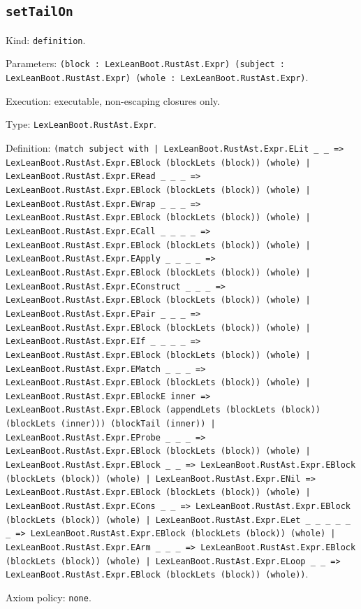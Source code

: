 \documentclass[11pt]{article}
\begin{document}
\subsection*{\texttt{setTailOn}}
\noindent Kind: \texttt{definition}.\par
\noindent Parameters: \texttt{(block : LexLeanBoot.RustAst.Expr) (subject : LexLeanBoot.RustAst.Expr) (whole : LexLeanBoot.RustAst.Expr)}.\par
\noindent Execution: executable, non-escaping closures only.\par
\noindent Type: \texttt{LexLeanBoot.RustAst.Expr}.\par
\noindent Definition: \texttt{(match subject with | LexLeanBoot.RustAst.Expr.ELit \_ \_ => LexLeanBoot.RustAst.Expr.EBlock (blockLets (block)) (whole) | LexLeanBoot.RustAst.Expr.ERead \_ \_ \_ => LexLeanBoot.RustAst.Expr.EBlock (blockLets (block)) (whole) | LexLeanBoot.RustAst.Expr.EWrap \_ \_ \_ => LexLeanBoot.RustAst.Expr.EBlock (blockLets (block)) (whole) | LexLeanBoot.RustAst.Expr.ECall \_ \_ \_ \_ => LexLeanBoot.RustAst.Expr.EBlock (blockLets (block)) (whole) | LexLeanBoot.RustAst.Expr.EApply \_ \_ \_ \_ => LexLeanBoot.RustAst.Expr.EBlock (blockLets (block)) (whole) | LexLeanBoot.RustAst.Expr.EConstruct \_ \_ \_ => LexLeanBoot.RustAst.Expr.EBlock (blockLets (block)) (whole) | LexLeanBoot.RustAst.Expr.EPair \_ \_ \_ => LexLeanBoot.RustAst.Expr.EBlock (blockLets (block)) (whole) | LexLeanBoot.RustAst.Expr.EIf \_ \_ \_ \_ => LexLeanBoot.RustAst.Expr.EBlock (blockLets (block)) (whole) | LexLeanBoot.RustAst.Expr.EMatch \_ \_ \_ => LexLeanBoot.RustAst.Expr.EBlock (blockLets (block)) (whole) | LexLeanBoot.RustAst.Expr.EBlockE inner => LexLeanBoot.RustAst.Expr.EBlock (appendLets (blockLets (block)) (blockLets (inner))) (blockTail (inner)) | LexLeanBoot.RustAst.Expr.EProbe \_ \_ \_ => LexLeanBoot.RustAst.Expr.EBlock (blockLets (block)) (whole) | LexLeanBoot.RustAst.Expr.EBlock \_ \_ => LexLeanBoot.RustAst.Expr.EBlock (blockLets (block)) (whole) | LexLeanBoot.RustAst.Expr.ENil => LexLeanBoot.RustAst.Expr.EBlock (blockLets (block)) (whole) | LexLeanBoot.RustAst.Expr.ECons \_ \_ => LexLeanBoot.RustAst.Expr.EBlock (blockLets (block)) (whole) | LexLeanBoot.RustAst.Expr.ELet \_ \_ \_ \_ \_ \_ => LexLeanBoot.RustAst.Expr.EBlock (blockLets (block)) (whole) | LexLeanBoot.RustAst.Expr.EArm \_ \_ \_ => LexLeanBoot.RustAst.Expr.EBlock (blockLets (block)) (whole) | LexLeanBoot.RustAst.Expr.ELoop \_ \_ => LexLeanBoot.RustAst.Expr.EBlock (blockLets (block)) (whole))}.\par
\noindent Axiom policy: \texttt{none}.\par
\end{document}
